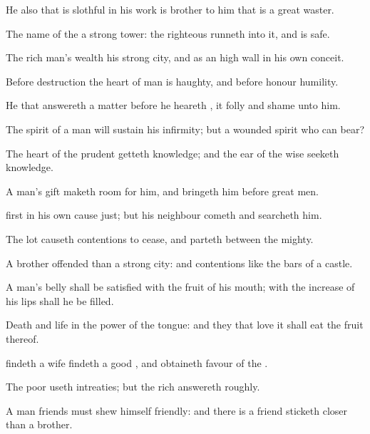 {He also that is
slothful in his
work is
brother to him that is a
great
waster.

The
name of the
{}
{} a
strong
tower: the
righteous
runneth into it, and is
safe.

The rich
man’s
wealth
{} his
strong
city, and as an
high
wall in his own
conceit.

Before
destruction the
heart of
man is
haughty, and
before
honour
{}
humility.

He that
answereth a
matter before he
heareth
{}, it
{}
folly and
shame unto him.

The
spirit of a
man will
sustain his
infirmity; but a
wounded
spirit who can
bear?

The
heart of the
prudent
getteth
knowledge; and the
ear of the
wise
seeketh
knowledge.

A
man’s
gift maketh
room for him, and
bringeth him
before great
men.

first in his own
cause
{}
just; but his
neighbour
cometh and
searcheth him.

The
lot causeth
contentions to
cease, and
parteth between the
mighty.

A
brother
offended
{} than a
strong
city: and
{}
contentions
{} like the
bars of a
castle.

A
man’s
belly shall be
satisfied with the
fruit of his
mouth;
{} with the
increase of his
lips shall he be
filled.

Death and
life
{} in the
power of the
tongue: and they that
love it shall
eat the
fruit thereof.

findeth a
wife
findeth a
good
{}, and
obtaineth
favour of the
{}.

The
poor
useth
intreaties; but the
rich
answereth
roughly.

A
man
{}
friends must shew himself
friendly: and there
is a
friend
{} sticketh
closer than a
brother.




\par }
